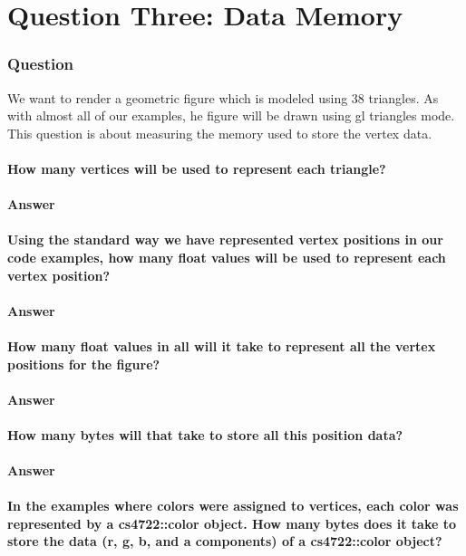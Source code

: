\documentclass{report}
\begin{document}
\part{Question Three: Data Memory}
\section{Question}
We want to render a geometric figure which is modeled using 38 triangles.
As with almost all of our examples, he figure will be drawn using gl triangles mode. This question is about measuring the memory used to store the vertex data.
\subsection{ How many vertices will be used to represent each triangle?}
\subsection{Answer}
\subsection{ Using the standard way we have represented vertex positions in our code examples, how many float values will be used to represent each vertex position?
}
\subsection{Answer}
\subsection{ How many float values in all will it take to represent all the vertex positions for the figure?
}
\subsection{Answer}
\subsection{ How many bytes will that take to store all this position data?
}
\subsection{Answer}
\subsection{ In the examples where colors were assigned to vertices, each color was represented by a cs4722::color object. How many bytes does it take to store the data (r, g, b, and a components) of a cs4722::color object?}
\end{document}
